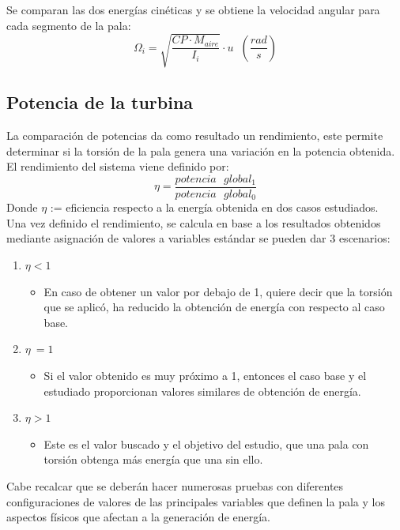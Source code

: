 Se comparan las dos energías cinéticas y se obtiene la velocidad angular para cada segmento de la pala:
\begin{equation}
    \Omega_i = \sqrt{\dfrac{CP \cdot M_{aire}}{I_i}} \cdot u  \hspace{7pt} (\dfrac{rad}{s})
\end{equation}


 \subsection{Potencia de la turbina}
 \label{section:rendimiento}
 
La comparación de potencias da como resultado un rendimiento, este permite determinar si la torsión de la pala genera una variación en la potencia obtenida.\\

El rendimiento del sistema viene definido por:
\begin{equation}
  \eta = \dfrac{potencia \text{ } global_1}{potencia \text{ } global_0}  
 \label{def:rendimiento_potencias}
 \end{equation}
  Donde $\eta$ := eficiencia respecto a la energía obtenida en dos casos estudiados.\\
 
 Una vez definido el rendimiento, se calcula en base a los resultados obtenidos mediante asignación de valores a variables estándar se pueden dar 3 escenarios:
 

\begin{enumerate}
    \item $\eta < 1$
        \begin{itemize}
            \item En caso de obtener un valor por debajo de 1, quiere decir que la torsión que se aplicó, ha reducido la obtención de energía con respecto al caso base. 
        \end{itemize}
    \item $\eta ~= 1$
        \begin{itemize}
            \item Si el valor obtenido es muy próximo a 1, entonces el caso base y el estudiado proporcionan valores similares de obtención de energía.
        \end{itemize}
    \item $\eta > 1$
        \begin{itemize}
            \item Este es el valor buscado y el objetivo del estudio, que una pala con torsión obtenga más energía que una sin ello.
        \end{itemize}
\end{enumerate}

Cabe recalcar que se deberán hacer numerosas pruebas con diferentes configuraciones de valores de las principales variables que definen la pala y los aspectos físicos que afectan a la generación de energía.